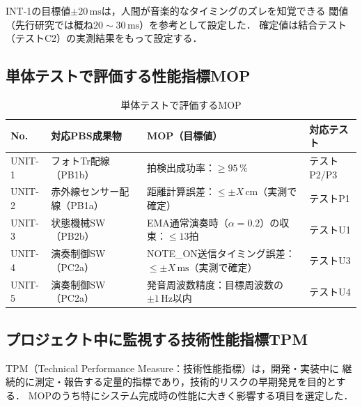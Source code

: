 \noindent
INT-1の目標値$\pm 20\,\mathrm{ms}$は，人間が音楽的なタイミングのズレを知覚できる
閾値（先行研究では概ね$20\sim30\,\mathrm{ms}$）を参考として設定した．
確定値は結合テスト（テストC2）の実測結果をもって設定する．

\subsection{単体テストで評価する性能指標MOP}

\begin{table}[H]
  \centering
  \begin{tabularx}{\linewidth}{llXl}
    \toprule
    No. & 対応PBS成果物 & MOP（目標値） & 対応テスト \\
    \midrule
    UNIT-1 & フォトTr配線（PB1b） &
      拍検出成功率：$\geq 95\,\%$ & テストP2/P3 \\
    UNIT-2 & 赤外線センサー配線（PB1a） &
      距離計算誤差：$\leq \pm X\,\mathrm{cm}$（実測で確定） & テストP1 \\
    UNIT-3 & 状態機械SW（PB2b） &
      EMA通常演奏時（$\alpha=0.2$）の収束：$\leq 13$拍 & テストU1 \\
    UNIT-4 & 演奏制御SW（PC2a） &
      NOTE\_ON送信タイミング誤差：$\leq \pm X\,\mathrm{ms}$（実測で確定） & テストU3 \\
    UNIT-5 & 演奏制御SW（PC2a） &
      発音周波数精度：目標周波数の$\pm 1\,\mathrm{Hz}$以内 & テストU4 \\
    \bottomrule
  \end{tabularx}
  \caption{単体テストで評価するMOP}
  \label{tab:mop-unit}
\end{table}

\subsection{プロジェクト中に監視する技術性能指標TPM}

TPM（Technical Performance Measure：技術性能指標）は，開発・実装中に
継続的に測定・報告する定量的指標であり，技術的リスクの早期発見を目的とする．
MOPのうち特にシステム完成時の性能に大きく影響する項目を選定した．

